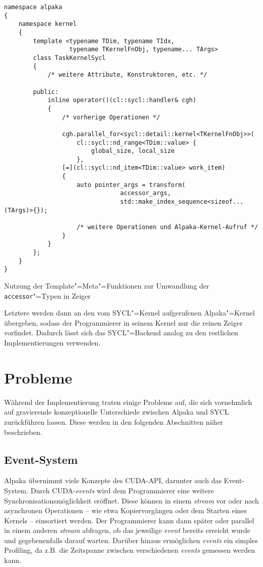 \begin{code}
    \begin{verbatim}
namespace alpaka
{
    namespace kernel
    {
        template <typename TDim, typename TIdx,
                  typename TKernelFnObj, typename... TArgs>
        class TaskKernelSycl
        {
            /* weitere Attribute, Konstruktoren, etc. */

        public:
            inline operator()(cl::sycl::handler& cgh)
            {
                /* vorherige Operationen */

                cgh.parallel_for<sycl::detail::kernel<TKernelFnObj>>(
                    cl::sycl::nd_range<TDim::value> {
                        global_size, local_size
                    },
                [=](cl::sycl::nd_item<TDim::value> work_item)
                {
                    auto pointer_args = transform(
                                accessor_args,
                                std::make_index_sequence<sizeof...(TArgs)>{});

                    /* weitere Operationen und Alpaka-Kernel-Aufruf */
                }
            }
        };
    }
}
    \end{verbatim}
    \caption{Nutzung der Template"=Meta"=Funktionen zur Umwandlung der
             \texttt{accessor}"=Typen in Zeiger}
    \label{implementierung:besonderheiten:zeiger:acctransusage}
\end{code}
Letztere werden dann an den vom SYCL"=Kernel aufgerufenen
Alpaka"=Kernel übergeben, sodass der Programmierer in seinem Kernel nur die
reinen Zeiger vorfindet. Dadurch lässt sich das SYCL"=Backend analog zu den
restlichen Implementierungen verwenden.

\section{Probleme}\label{implementierung:probleme}

Während der Implementierung traten einige Probleme auf, die sich vornehmlich
auf gravierende konzeptionelle Unterschiede zwischen Alpaka und SYCL
zurückführen lassen. Diese werden in den folgenden Abschnitten näher
beschrieben.

\subsection{Event-System}\label{implementierung:probleme:events}

Alpaka übernimmt viele Konzepte des CUDA-API, darunter auch das Event-System.
Durch CUDA-\textit{events} wird dem Programmierer eine weitere
Synchronisationsmöglichkeit eröffnet. Diese können in einem \textit{stream} vor
oder nach asynchronen Operationen -- wie etwa Kopiervorgängen oder dem Starten
eines Kernels -- einsortiert werden. Der Programmierer kann dann später oder
parallel in einem anderen \textit{stream} abfragen, ob das jeweilige
\textit{event} bereits erreicht wurde und gegebenenfalls darauf warten. Darüber
hinaus ermöglichen \textit{events} ein simples Profiling, da z.B. die Zeitspanne
zwischen verschiedenen \textit{events} gemessen werden kann.

